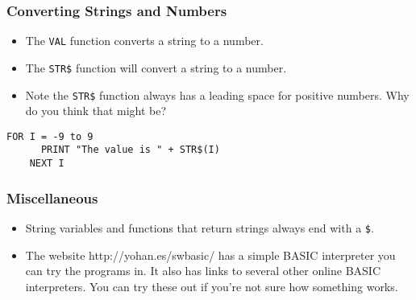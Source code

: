 \documentclass[handout,fleqn, t]{beamer}
\begin{document}
\begin{frame}[fragile]
  \frametitle{Converting Strings and Numbers}
  
  \begin{itemize}
    \item The \lstinline{VAL} function converts a string to a number.
    \item The \lstinline{STR$} function will convert a string to a number.
    \item Note the \lstinline{STR$} function always has a leading space for positive numbers.  Why do you think that might be?
  \end{itemize}
  
  \begin{lstlisting}[gobble=4]
    FOR I = -9 to 9
      PRINT "The value is " + STR$(I)
    NEXT I
  \end{lstlisting}
\end{frame}

\begin{frame}
  \frametitle{Miscellaneous}
  \begin{itemize}
    \item String variables and functions that return strings always end with a \lstinline{$}.
    \item The website http://yohan.es/swbasic/ has a simple BASIC interpreter you can try the programs in.  It also has links to several other online BASIC interpreters.  You can try these out if you're not sure how something works.
  \end{itemize}
\end{frame}
\end{document}
